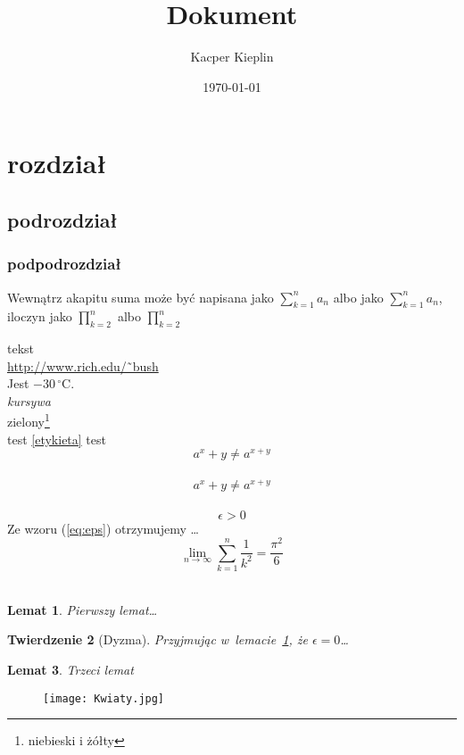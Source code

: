 \documentclass[a4paper,11pt]{article}
\title{Dokument}
\author{Kacper Kieplin}
\date{ \today}
\newtheorem{twr}{Twierdzenie}
\newtheorem{lem}[twr]{Lemat}
\begin{document}
\maketitle
\begin{center}
\tableofcontents
\end{center}

\section{rozdział}
\subsection{podrozdział}
\subsubsection{podpodrozdział} 

Wewnątrz akapitu suma może być napisana jako $\sum^n_{k=1}a_n$ albo jako $\displaystyle\sum^n_{k=1}a_n$, iloczyn jako $\prod^n _{k=2}$ albo $\displaystyle\prod^n _{k=2}$

tekst\\
\url{http://www.rich.edu/˜bush}\\
Jest $-30\,^{\circ}\mathrm{C}$.\\
\emph{kursywa}\\
zielony\footnote{niebieski i żółty}\\

\label{etykieta}
test
\ref{etykieta}
test
\pageref{etykieta}\\

\begin{displaymath}
a^x+y \neq a^{x+y}
\end{displaymath}\\

\begin{equation}
a^x+y \neq a^{x+y}
\end{equation}\\

\begin{equation}
\epsilon > 0 \label{eq:eps}
\end{equation}
Ze wzoru (\ref{eq:eps})
otrzymujemy \ldots\\

\begin{displaymath}
\lim_{n \to \infty}
\sum_{k=1}^n \frac{1}{k^2}
= \frac{\pi^2}{6}
\end{displaymath}\\


\begin{lem} Pierwszy
lemat\dots\label{lem:1} \end{lem}
\begin{twr}[Dyzma]
Przyjmując w~lemacie~\ref{lem:1},
że $\epsilon=0$\dots \end{twr}
\begin{lem}Trzeci lemat\end{lem}

\begin{figure}
\centering
\texttt{[image: Kwiaty.jpg]}
\end{figure}
\end{document}
